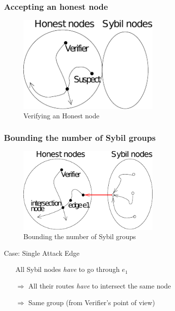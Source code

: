 \documentclass{beamer}
\begin{document}
\begin{frame}

  \frametitle{Accepting an honest node}

  \begin{figure}
    \includegraphics[width=7cm]{./pictures/verify_honest} 
    \caption{Verifying an Honest node}
  \end{figure}

\end{frame}


\begin{frame}

  \frametitle{Bounding the number of Sybil groups}

  \begin{figure}
    \includegraphics[width=7cm]{./pictures/bound_group} 
    \caption{Bounding the number of Sybil groups}
  \end{figure}

  \begin{block}{Case: Single Attack Edge}
    \begin{itemize}
    \item[] All Sybil nodes \emph{have} to go through $e_1$
    \item[$\Rightarrow$] All their routes \emph{have} to intersect the same node %
    \item[$\Rightarrow$] Same group (from Verifier's point of view)
    \end{itemize}
  \end{block}

\end{frame}
\end{document}
